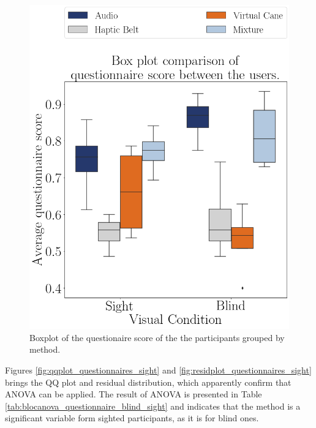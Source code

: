 \begin{figure}[!htb]
    \centering
    \includegraphics[width = 0.6\linewidth]{Resultados/Questionario/Figuras/png/boxplot_questionnaire_scene.png}
    \caption{Boxplot of the questionaire score of the the participants grouped by method.}
    \label{fig:boxplot_questionnaire_scene}
\end{figure}

%
%
%

Figures \ref{fig:qqplot_questionnaires_sight} and \ref{fig:residplot_questionnaires_sight} brings the QQ plot and residual distribution, which apparently confirm that ANOVA can be applied. The result of ANOVA is presented in Table \ref{tab:blocanova_questionnaire_blind_sight} and indicates that the method is a significant variable form sighted participants, as it is for blind ones.

